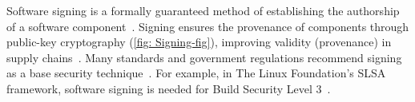 \documentclass{IEEEcsmagTechrxiv}
\begin{document}
	Software signing is a formally guaranteed method of establishing the authorship of a software component~\cite{Garfinkel2003-pa,rfc4880,Internet-Security-Glossary,cooper_security_2018}.
	Signing ensures the provenance of components through public-key cryptography (\cref{fig: Signing-fig}), improving validity (provenance) in supply chains~\cite{okafor_sok}.
	Many standards and government regulations recommend signing as a base \ssc security technique~\cite{SLSA_The_Linux_Foundation_2023, EO_2021, souppaya_secure_2022, noauthor_microsoftscim_2023,cncf_2021}.
	For example, in The Linux Foundation's SLSA framework, software signing is needed for Build Security Level 3~\cite{SLSA_The_Linux_Foundation_2023}.
\fi




%
%
%
%
%
\end{document}
